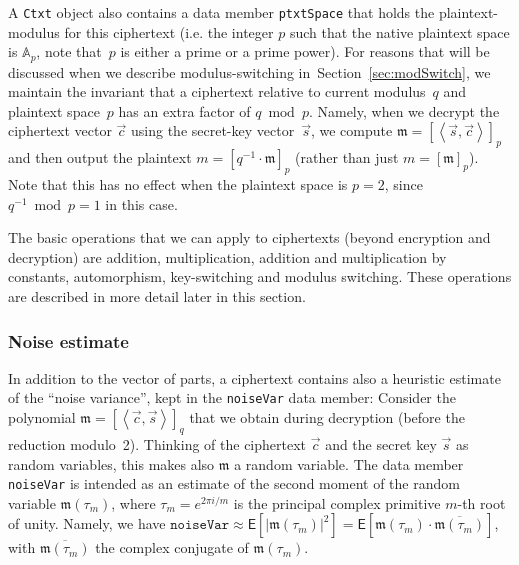 \documentclass[14pt]{extarticle}
\newcommand{\secref}[1]{Section~\protect\ref{sec:#1}}
\newcommand{\A}{\mathbb{A}}
\newcommand{\grp}[1]{\left\langle #1 \right\rangle}
\def\EXP{\mathsf{E}}
\def\vc{\vec{c}}
\def\vs{\vec{s}}
\newcommand{\mm}{\mathfrak{m}}
\begin{document}
A \texttt{Ctxt} object also contains a data member \texttt{ptxtSpace}
that holds the plaintext-modulus for this ciphertext (i.e. the integer
$p$ such that the native plaintext space is $\A_p$, note that~$p$ is
either a prime or a prime power).
For reasons that will be discussed when we describe modulus-switching
in~\secref{modSwitch}, we maintain the invariant that a ciphertext
relative to current modulus~$q$ and plaintext space~$p$ has an extra
factor of $q \bmod p$. Namely, when we decrypt the ciphertext vector
$\vc$ using the secret-key vector~$\vs$, we compute $\mm=[\grp{\vs,
\vc}]_{p}$ and then output the plaintext $m=[q^{-1}\cdot\mm]_{p}$
(rather than just $m=[\mm]_p$). Note that this has no effect when the
plaintext space is $p=2$, since $q^{-1} \bmod p=1$ in this case.

The basic operations that we can apply to ciphertexts (beyond
encryption and decryption) are addition, multiplication, addition and
multiplication by constants, automorphism, key-switching and modulus
switching. These operations are described in more detail later in
this section.

\subsubsection{Noise estimate} \label{sec:noise}
In addition to the vector of parts, a ciphertext contains also a
heuristic estimate of the ``noise variance'', kept in the
\texttt{noiseVar} data member: Consider the polynomial
$\mm=[\grp{\vc,\vs}]_q$ that we obtain during decryption (before the
reduction modulo~2). Thinking of the ciphertext $\vc$ and the secret
key $\vs$ as random variables, this makes also $\mm$ a random
variable. The data member \texttt{noiseVar} is intended as an
estimate of the second moment of the random variable $\mm(\tau_m)$,
where $\tau_m=e^{2\pi i/m}$ is the principal complex primitive $m$-th
root of unity. Namely, we have $\mathtt{noiseVar}\approx \EXP[|\mm(
\tau_m)|^2]=\EXP[\mm(\tau_m)\cdot\overline{\mm(\tau_m)}]$, with
$\overline{\mm(\tau_m)}$ the complex conjugate of $\mm(\tau_m)$.
\end{document}
